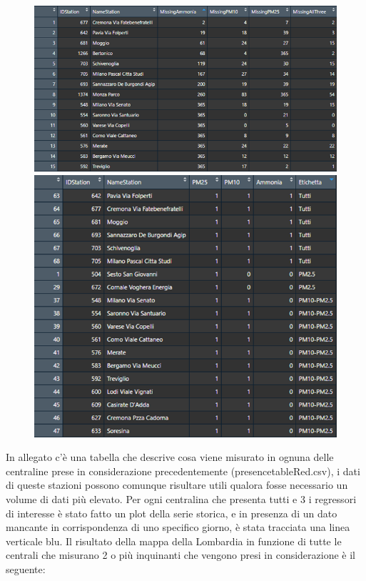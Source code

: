 \documentclass{article}
\begin{document}
\begin{figure}[h!]
  \centering
  \includegraphics[scale=0.75]{Picture/b.png}
  \centering
  \includegraphics[scale=0.65]{Picture/PresenceTable.png}       
\end{figure}

In allegato c'è una tabella che descrive cosa viene misurato in ognuna
delle centraline prese in considerazione precedentemente (presencetableRed.csv), i dati di queste stazioni possono comunque risultare utili qualora fosse necessario un volume di dati più elevato.
Per ogni centralina che presenta tutti e 3 i regressori di interesse è stato fatto
un plot della serie storica, e in presenza di un dato mancante in corrispondenza   
di uno specifico giorno, è stata tracciata una linea verticale blu.
Il risultato della mappa della Lombardia in funzione di tutte le centrali che misurano 2 o più inquinanti che 
vengono presi in considerazione è il seguente:
\end{document}

